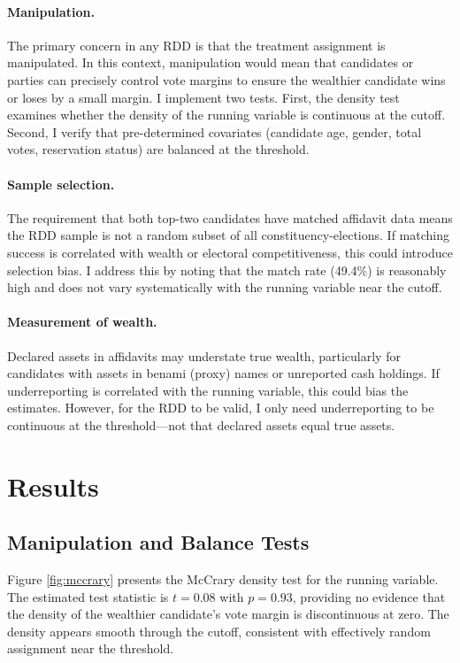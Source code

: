 \documentclass[12pt]{article}
\begin{document}
\paragraph{Manipulation.} The primary concern in any RDD is that the treatment assignment is manipulated. In this context, manipulation would mean that candidates or parties can precisely control vote margins to ensure the wealthier candidate wins or loses by a small margin. I implement two tests. First, the \citet{cattaneo2020simple} density test examines whether the density of the running variable is continuous at the cutoff. Second, I verify that pre-determined covariates (candidate age, gender, total votes, reservation status) are balanced at the threshold.

\paragraph{Sample selection.} The requirement that both top-two candidates have matched affidavit data means the RDD sample is not a random subset of all constituency-elections. If matching success is correlated with wealth or electoral competitiveness, this could introduce selection bias. I address this by noting that the match rate (49.4\%) is reasonably high and does not vary systematically with the running variable near the cutoff.

\paragraph{Measurement of wealth.} Declared assets in affidavits may understate true wealth, particularly for candidates with assets in benami (proxy) names or unreported cash holdings. If underreporting is correlated with the running variable, this could bias the estimates. However, for the RDD to be valid, I only need underreporting to be continuous at the threshold---not that declared assets equal true assets.


\section{Results}

\subsection{Manipulation and Balance Tests}

Figure \ref{fig:mccrary} presents the McCrary density test for the running variable. The estimated test statistic is $t = 0.08$ with $p = 0.93$, providing no evidence that the density of the wealthier candidate's vote margin is discontinuous at zero. The density appears smooth through the cutoff, consistent with effectively random assignment near the threshold.
\end{document}
